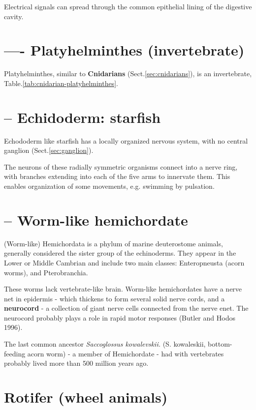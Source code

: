 Electrical signals can spread through the common epithelial lining of the
digestive cavity.



\section{---- Platyhelminthes (invertebrate)}
\label{sec:Platyhelminthes}



Platyhelminthes, similar to {\bf Cnidarians} (Sect.\ref{sec:cnidarians}), is an
invertebrate, Table.\ref{tab:cnidarian-platyhelminthes}.

\section{-- Echidoderm: starfish}
\label{sec:starfish-brain}

Echododerm like starfish has a locally organized nervous system, with no central
ganglion (Sect.\ref{sec:ganglion}).

The neurons of these radially symmetric organisms connect into a nerve ring,
with branches extending into each of the five arms to innervate them. This
enables organization of some movements, e.g. swimming by pulsation. 


\section{-- Worm-like hemichordate}
\label{sec:Hemichordate}

(Worm-like) Hemichordata is a phylum of marine deuterostome animals, generally
considered the sister group of the echinoderms. They appear in the Lower or
Middle Cambrian and include two main classes: Enteropneusta (acorn worms), and
Pterobranchia. 

These worms lack vertebrate-like brain. Worm-like hemichordates have a nerve net
in epidermis - which thickens to form several solid nerve cords, and a {\bf
neurocord} - a collection of giant nerve cells connected from the nerve enet.
The neurocord probably plays a role in rapid motor responses (Butler and Hodos
1996).

The last common ancestor {\it Saccoglossus kowalevskii.} (S. kowaleskii,
bottom-feeding acorn worm) - a member of Hemichordate - had with vertebrates
probably lived more than 500 million years ago.



\section{Rotifer (wheel animals)}
\label{sec:rotifer}

